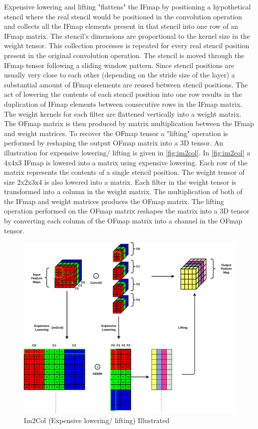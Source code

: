 Expensive lowering and lifting "flattens" the IFmap by positioning a
hypothetical stencil where the real stencil would be positioned in the
convolution operation and collects all the IFmap elements present in that
stencil into one row of an IFmap matrix. The stencil's dimensions are proportional to
the kernel size in the weight tensor. This collection processes is repeated
for every real stencil position present in the original convolution operation.
The stencil is moved through the IFmap tensor following a sliding window pattern.
Since stencil positions are usually very close to each other (depending on the
stride size of the layer) a substantial amount of IFmap elements are reused
between stencil positions. The act of lowering the contents of each stencil
position into one row results in the duplication of IFmap elements between
consecutive rows in the IFmap matrix.  
The weight kernels for each filter are flattened vertically into a weight
matrix. The OFmap matrix is then produced by matrix multiplication between the
IFmap and weight matrices. To recover the OFmap tensor a "lifting" operation is
performed by reshaping the output OFmap matrix into a 3D tensor. An illustration
for expensive lowering/ lifting is given in \autoref{fig:im2col}. In
\autoref{fig:im2col} a 4x4x3 IFmap is lowered into a matrix using expensive
lowering. Each row of the matrix represents the contents of a single stencil
position. The weight tensor of size 2x2x3x4 is also lowered into a matrix. Each
filter in the weight tensor is transformed into a column in the weight matrix.
The multiplication of both of the IFmap and weight matrices produces the OFmap
matrix. The lifting operation performed on the OFmap matrix reshapes the matrix
into a 3D tensor by converting each column of the OFmap matrix into a channel in
the OFmap tensor. 

\begin{figure}[!ht]
    \centering
    \includegraphics[scale=0.6]{fig/Im2Col.pdf}
    \caption{Im2Col (Expensive lowering/ lifting) Illustrated}
    \label{fig:im2col}
\end{figure}

